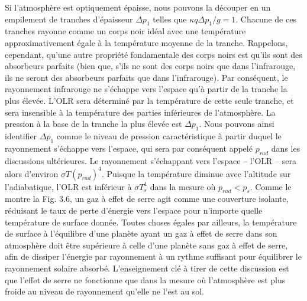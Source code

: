 \documentclass[11pt, a4paper]{article}
\begin{document}
\begin{figure}
\resizebox{\textwidth}{!}{%

}
\end{figure}


Si l'atmosphère est optiquement épaisse, nous pouvons la découper en un empilement de tranches d'épaisseur $\Delta p_1$ telles que $\kappa q \Delta p_1/g = 1$. Chacune de ces tranches rayonne comme un corps noir idéal avec une température approximativement égale à la température moyenne de la tranche. Rappelons, cependant, qu'une autre propriété fondamentale des corps noirs est qu'ils sont des absorbeurs parfaits (bien que, s'ils ne sont des corps noirs que dans l'infrarouge, ils ne seront des absorbeurs parfaits que dans l'infrarouge). Par conséquent, le rayonnement infrarouge ne s'échappe vers l'espace qu'à partir de la tranche la plus élevée. L'OLR sera déterminé par la température de cette seule tranche, et sera insensible à la température des parties inférieures de l'atmosphère. La pression à la base de la tranche la plus élevée est $\Delta p_1$. Nous pouvons ainsi identifier $\Delta p_1$ comme le niveau de pression caractéristique à partir duquel le rayonnement s'échappe vers l'espace, qui sera par conséquent appelé $p_{rad}$ dans les discussions ultérieures. Le rayonnement s'échappant vers l'espace – l'OLR – sera alors d'environ $\sigma T(p_{rad})^4$.
Puisque la température diminue avec l'altitude sur l'adiabatique, l'OLR est inférieur à $\sigma T_s^4$ dans la mesure où $p_{rad} < p_s$. Comme le montre la Fig. 3.6, un gaz à effet de serre agit comme une couverture isolante, réduisant le taux de perte d'énergie vers l'espace pour n'importe quelle température de surface donnée. Toutes choses égales par ailleurs, la température de surface à l'équilibre d'une planète ayant un gaz à effet de serre dans son atmosphère doit être supérieure à celle d'une planète sans gaz à effet de serre, afin de dissiper l'énergie par rayonnement à un rythme suffisant pour équilibrer le rayonnement solaire absorbé. L'enseignement clé à tirer de cette discussion est que l'effet de serre ne fonctionne que dans la mesure où l'atmosphère est plus froide au niveau de rayonnement qu'elle ne l'est au sol.
\end{document}
